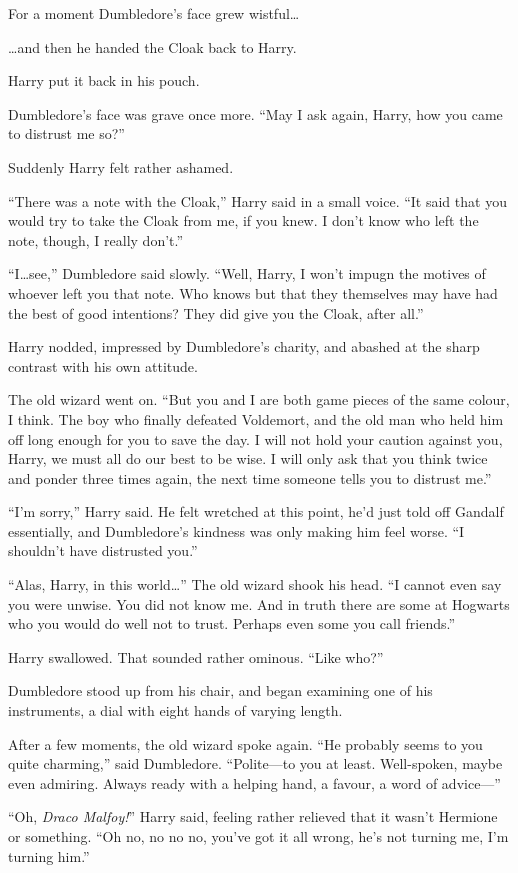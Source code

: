 For a moment Dumbledore’s face grew wistful…

…and then he handed the Cloak back to Harry.

Harry put it back in his pouch.

Dumbledore’s face was grave once more. “May I ask again, Harry, how you came to distrust me so?”

Suddenly Harry felt rather ashamed.

“There was a note with the Cloak,” Harry said in a small voice. “It said that you would try to take the Cloak from me, if you knew. I don’t know who left the note, though, I really don’t.”

“I…see,” Dumbledore said slowly. “Well, Harry, I won’t impugn the motives of whoever left you that note. Who knows but that they themselves may have had the best of good intentions? They did give you the Cloak, after all.”

Harry nodded, impressed by Dumbledore’s charity, and abashed at the sharp contrast with his own attitude.

The old wizard went on. “But you and I are both game pieces of the same colour, I think. The boy who finally defeated Voldemort, and the old man who held him off long enough for you to save the day. I will not hold your caution against you, Harry, we must all do our best to be wise. I will only ask that you think twice and ponder three times again, the next time someone tells you to distrust me.”

“I’m sorry,” Harry said. He felt wretched at this point, he’d just told off Gandalf essentially, and Dumbledore’s kindness was only making him feel worse. “I shouldn’t have distrusted you.”

“Alas, Harry, in this world…” The old wizard shook his head. “I cannot even say you were unwise. You did not know me. And in truth there are some at Hogwarts who you would do well not to trust. Perhaps even some you call friends.”

Harry swallowed. That sounded rather ominous. “Like who?”

Dumbledore stood up from his chair, and began examining one of his instruments, a dial with eight hands of varying length.

After a few moments, the old wizard spoke again. “He probably seems to you quite charming,” said Dumbledore. “Polite—to you at least. Well-spoken, maybe even admiring. Always ready with a helping hand, a favour, a word of advice—”

“Oh, \emph{Draco Malfoy!}” Harry said, feeling rather relieved that it wasn’t Hermione or something. “Oh no, no no no, you’ve got it all wrong, he’s not turning me, I’m turning him.”

